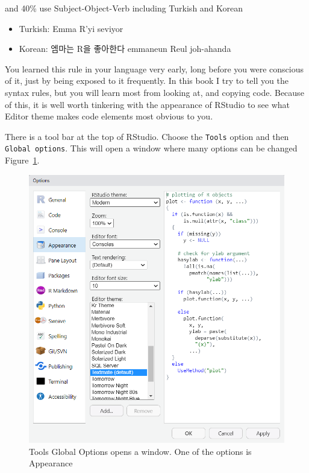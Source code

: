 \documentclass[
  letterpaper,
  DIV=11,
  numbers=noendperiod]{scrreprt}
\providecommand{\tightlist}{%
  \setlength{\itemsep}{0pt}\setlength{\parskip}{0pt}}\usepackage{longtable,booktabs,array}
\begin{document}
and 40\% use Subject-Object-Verb including Turkish and Korean

\begin{itemize}
\tightlist
\item
  Turkish: Emma R'yi seviyor
\item
  Korean: 엠마는 R을 좋아한다 emmaneun Reul joh-ahanda
\end{itemize}

You learned this rule in your language very early, long before you were
conscious of it, just by being exposed to it frequently. In this book I
try to tell you the syntax rules, but you will learn most from looking
at, and copying code. Because of this, it is well worth tinkering with
the appearance of RStudio to see what Editor theme makes code elements
most obvious to you.

There is a tool bar at the top of RStudio. Choose the \texttt{Tools}
option and then \texttt{Global\ options}. This will open a window where
many options can be changed
Figure~\ref{fig-tools-global-options-appearance}.

\begin{figure}

{\centering \includegraphics[width=8.33333in,height=\textheight]{images/tools-global-options-appearance.png}

}

\caption{\label{fig-tools-global-options-appearance}Tools \textbar{}
Global Options opens a window. One of the options is Appearance}

\end{figure}
\end{document}
